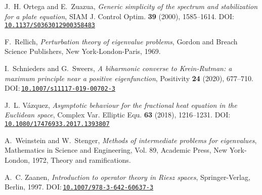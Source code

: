 \documentclass[a4paper, reqno]{amsart}
\numberwithin{equation}{section}
\theoremstyle{plain}
\theoremstyle{definition}
\theoremstyle{remark}
\begin{document}
\begin{thebibliography}{10}
J.~H. Ortega and E.~Zuazua, \emph{Generic simplicity of the spectrum and
  stabilization for a plate equation}, SIAM J. Control Optim. \textbf{39}
  (2000), 1585--1614.
  DOI:\,\href{https://doi.org/10.1137/S0363012900358483}{\nolinkurl{10.1137/S0363012900358483}}

F.~Rellich, \emph{Perturbation theory of eigenvalue problems}, Gordon and
  Breach Science Publishers, New York-London-Paris, 1969.

I.~Schnieders and G.~Sweers, \emph{A biharmonic converse to {K}rein-{R}utman: a
  maximum principle near a positive eigenfunction}, Positivity \textbf{24}
  (2020), 677--710.
  DOI:\,\href{https://doi.org/10.1007/s11117-019-00702-3}{\nolinkurl{10.1007/s11117-019-00702-3}}

J.~L. V\'{a}zquez, \emph{Asymptotic behaviour for the fractional heat equation
  in the {E}uclidean space}, Complex Var. Elliptic Equ. \textbf{63} (2018),
  1216--1231.
  DOI:\,\href{https://doi.org/10.1080/17476933.2017.1393807}{\nolinkurl{10.1080/17476933.2017.1393807}}

A.~Weinstein and W.~Stenger, \emph{Methods of intermediate problems for
  eigenvalues}, Mathematics in Science and Engineering, Vol. 89, Academic
  Press, New York-London, 1972, Theory and ramifications.

A.~C. Zaanen, \emph{Introduction to operator theory in {R}iesz spaces},
  Springer-Verlag, Berlin, 1997.
  DOI:\,\href{https://doi.org/10.1007/978-3-642-60637-3}{\nolinkurl{10.1007/978-3-642-60637-3}}

\end{thebibliography}
\end{document}

